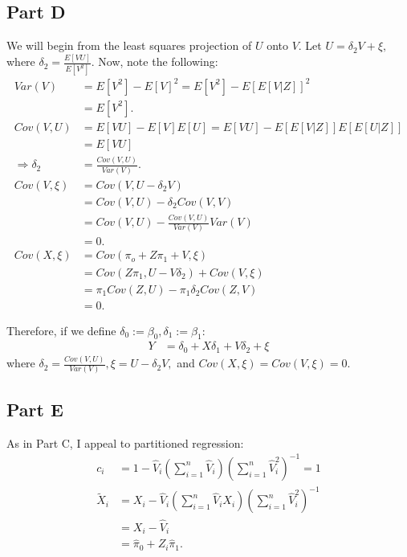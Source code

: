 \documentclass[11pt]{article} %
\begin{document}
\subsection{Part D}
We will begin from the least squares projection of $U$ onto $V$. Let $U = \delta_2 V + \xi,$ where $\delta_2 = \frac{E[VU]}{E[V^2]}$. Now, note the following:
\begin{align*}
Var(V) &= E[V^2] - E[V]^2 = E[V^2] - E[E[V|Z]]^2\\
&= E[V^2]. \\
Cov(V,U) &= E[VU] - E[V]E[U] = E[VU] - E[E[V|Z]]E[E[U|Z]] \\
&= E[VU]\\
\Rightarrow \delta_2 &= \frac{Cov(V,U)}{Var(V)}.\\
Cov(V,\xi) &= Cov(V,U-\delta_2 V)\\
&= Cov(V,U) - \delta_2 Cov(V,V)\\
&= Cov(V,U) - \frac{Cov(V,U)}{Var(V)} Var(V)\\
&= 0.\\
Cov(X,\xi) &= Cov(\pi_o + Z\pi_1 + V,\xi)\\
&= Cov(Z\pi_1,U-V\delta_2) + Cov(V,\xi)\\
&= \pi_1Cov(Z,U) - \pi_1\delta_2Cov(Z,V)\\
&= 0.
\end{align*}

Therefore, if we define $\delta_0:= \beta_0, \delta_1:=\beta_1:$
\begin{align*}
Y &= \delta_0 + X\delta_1 + V\delta_2 + \xi
\end{align*}
where $\delta_2 = \frac{Cov(V,U)}{Var(V)}, \xi = U - \delta_2V,$ and $Cov(X,\xi) = Cov(V,\xi) = 0$.
\subsection{Part E}
As in Part C, I appeal to partitioned regression:
\begin{align*}
c_i &= 1-\hat{V}_i\left( \sum_{i=1}^n \hat{V}_i \right) \left( \sum_{i=1}^n \hat{V}_i^2\right)^{-1} = 1\\
\tilde{X}_i &= X_i - \hat{V}_i\left( \sum_{i=1}^n \hat{V}_iX_i \right) \left( \sum_{i=1}^n \hat{V}_i^2\right)^{-1}\\
&= X_i - \hat{V}_i\\
&= \hat{\pi}_0 + Z_i \hat{\pi}_1.
\end{align*}
\end{document}
